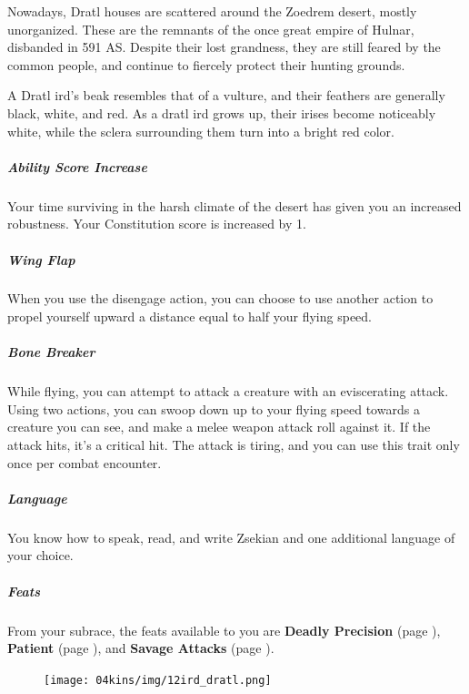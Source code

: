     Nowadays, Dratl houses are scattered around the Zoedrem desert, mostly unorganized.
    These are the remnants of the once great empire of Hulnar, disbanded in 591 AS.
    Despite their lost grandness, they are still feared by the common people, and continue to fiercely protect their hunting grounds.

    A Dratl ird's beak resembles that of a vulture, and their feathers are generally black, white, and red.
    As a dratl ird grows up, their irises become noticeably white, while the sclera surrounding them turn into a bright red color.

    \subparagraph{Ability Score Increase} Your time surviving in the harsh climate of the desert has given you an increased robustness.
    Your Constitution score is increased by 1.

    \subparagraph{Wing Flap} When you use the disengage action, you can choose to use another action to propel yourself upward a distance equal to half your flying speed.

    \subparagraph{Bone Breaker} While flying, you can attempt to attack a creature with an eviscerating attack.
    Using two actions, you can swoop down up to your flying speed towards a creature you can see, and make a melee weapon attack roll against it.
    If the attack hits, it's a critical hit.
    The attack is tiring, and you can use this trait only once per combat encounter.

    \subparagraph{Language} You know how to speak, read, and write Zsekian and one additional language of your choice.

    \subparagraph{Feats} From your subrace, the feats available to you are
    \textbf{Deadly Precision} (page \pageref{feat::deadlyprecision}),
    \textbf{Patient} (page \pageref{feat::patient}), and
    \textbf{Savage Attacks} (page \pageref{feat::savageattacks}).

\begin{figure}[!b]
    \centering
    \texttt{[image: 04kins/img/12ird\_dratl.png]}
\end{figure}


\newpage
